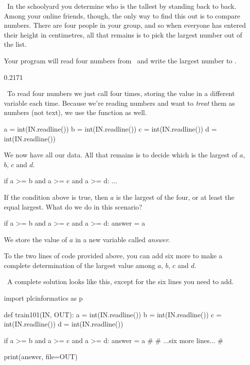 
\Question\ In the schoolyard you determine who is the tallest by standing back to back.
Among your online friends, though, the only way to find this out is to compare numbers.
There are four people in your group, and so when everyone has entered their height in
centimetres, all that remains is to pick the largest number out of the list.

Your program will read four numbers from \IN\ and write the largest number to \OUT.

\Sample

       {0.2}{171}

\Scratch\ To read four numbers we just call  four times, storing the
value in a different variable each time. Because we're reading numbers and want to
\emph{treat} them as numbers (not text), we use the  function as well.

\begin{pythoncode}
    a = int(IN.readline())
    b = int(IN.readline())
    c = int(IN.readline())
    d = int(IN.readline())
\end{pythoncode}

We now have all our data. All that remains is to decide which is the largest of $a$, $b$,
$c$ and $d$.

\begin{pythoncode}
    if a >= b and a >= c and a >= d:
        ...
\end{pythoncode}

If the condition above is true, then $a$ is the largest of the four, or at least the equal
largest. What do we do in this scenario?

\begin{pythoncode}
    if a >= b and a >= c and a >= d:
        answer = a
\end{pythoncode}

We store the value of $a$ in a new variable called \emph{answer}.

To the two lines of code provided above, you can add six more to make a complete
determination of the largest value among $a$, $b$, $c$ and $d$.

\Solution\ A complete solution looks like this, except for the six lines you need to add.

\begin{pythoncode}
    import plcinformatics as p

    def train101(IN, OUT):
        a = int(IN.readline())
        b = int(IN.readline())
        c = int(IN.readline())
        d = int(IN.readline())

        if a >= b and a >= c and a >= d:
            answer = a
        #
        # ...six more lines...
        #

        print(answer, file=OUT)
\end{pythoncode}

